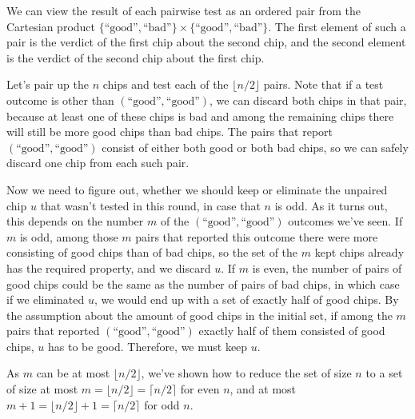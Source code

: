We can view the result of each pairwise test as an ordered pair from the Cartesian product $\{\text{``good''},\text{``bad''}\}\times\{\text{``good''},\text{``bad''}\}$.
The first element of such a pair is the verdict of the first chip about the second chip, and the second element is the verdict of the second chip about the first chip.

Let's pair up the $n$ chips and test each of the $\lfloor n/2\rfloor$ pairs.
Note that if a test outcome is other than $(\text{``good''},\text{``good''})$, we can discard both chips in that pair, because at least one of these chips is bad and among the remaining chips there will still be more good chips than bad chips.
The pairs that report $(\text{``good''},\text{``good''})$ consist of either both good or both bad chips, so we can safely discard one chip from each such pair.

Now we need to figure out, whether we should keep or eliminate the unpaired chip $u$ that wasn't tested in this round, in case that $n$ is odd.
As it turns out, this depends on the number $m$ of the $(\text{``good''},\text{``good''})$ outcomes we've seen.
If $m$ is odd, among those $m$ pairs that reported this outcome there were more consisting of good chips than of bad chips, so the set of the $m$ kept chips already has the required property, and we discard $u$.
If $m$ is even, the number of pairs of good chips could be the same as the number of pairs of bad chips, in which case if we eliminated $u$, we would end up with a set of exactly half of good chips.
By the assumption about the amount of good chips in the initial set, if among the $m$ pairs that reported $(\text{``good''},\text{``good''})$ exactly half of them consisted of good chips, $u$ has to be good.
Therefore, we must keep $u$.

As $m$ can be at most $\lfloor n/2\rfloor$, we've shown how to reduce the set of size $n$ to a set of size at most $m=\lfloor n/2\rfloor=\lceil n/2\rceil$ for even $n$, and at most $m+1=\lfloor n/2\rfloor+1=\lceil n/2\rceil$ for odd $n$.
